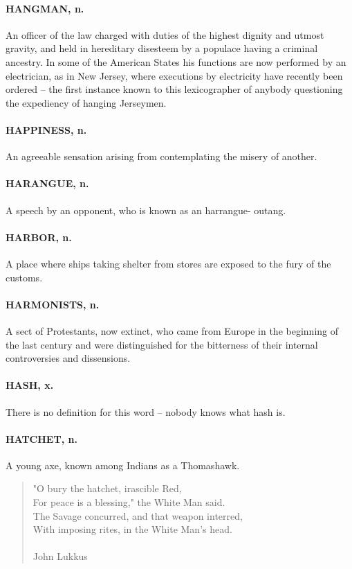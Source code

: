 \documentclass[11pt]{article}
\begin{document}
\paragraph{HANGMAN, n.}  An officer of the law charged with duties of the highest
dignity and utmost gravity, and held in hereditary disesteem by a
populace having a criminal ancestry.  In some of the American States
his functions are now performed by an electrician, as in New Jersey,
where executions by electricity have recently been ordered -- the
first instance known to this lexicographer of anybody questioning the
expediency of hanging Jerseymen.

\paragraph{HAPPINESS, n.}  An agreeable sensation arising from contemplating the
misery of another.

\paragraph{HARANGUE, n.}  A speech by an opponent, who is known as an harrangue-
outang.

\paragraph{HARBOR, n.}  A place where ships taking shelter from stores are exposed
to the fury of the customs.

\paragraph{HARMONISTS, n.}  A sect of Protestants, now extinct, who came from
Europe in the beginning of the last century and were distinguished for
the bitterness of their internal controversies and dissensions.

\paragraph{HASH, x.}  There is no definition for this word -- nobody knows what
hash is.

\paragraph{HATCHET, n.}  A young axe, known among Indians as a Thomashawk.

\begin{quote}   "O bury the hatchet, irascible Red, \\
  For peace is a blessing," the White Man said. \\
      The Savage concurred, and that weapon interred, \\
  With imposing rites, in the White Man's head. \\
 \\
John Lukkus \end{quote}
\end{document}
